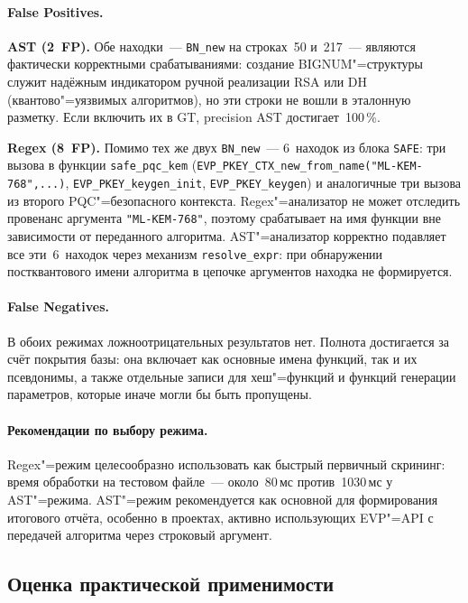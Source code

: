 \paragraph{False Positives.}
\textbf{AST (2~FP).}
Обе находки~--- \texttt{BN\_new} на строках~50 и~217~---
являются фактически корректными срабатываниями: создание
BIGNUM"=структуры служит надёжным индикатором ручной реализации
RSA или DH (квантово"=уязвимых алгоритмов), но эти строки не
вошли в эталонную разметку.
Если включить их в GT, precision AST достигает~100\,\%.

\textbf{Regex (8~FP).}
Помимо тех же двух \texttt{BN\_new}~--- 6~находок из блока
\texttt{SAFE}: три вызова в функции \texttt{safe\_pqc\_kem}
(\texttt{EVP\_PKEY\_CTX\_new\_from\_name("ML-KEM-768",...)},
\texttt{EVP\_PKEY\_keygen\_init}, \texttt{EVP\_PKEY\_keygen})
и аналогичные три вызова из второго PQC"=безопасного контекста.
Regex"=анализатор не может отследить провенанс аргумента
\texttt{"ML-KEM-768"}, поэтому срабатывает на имя функции
вне зависимости от переданного алгоритма.
AST"=анализатор корректно подавляет все эти~6~находок через
механизм \texttt{resolve\_expr}: при обнаружении постквантового
имени алгоритма в цепочке аргументов находка не формируется.

\paragraph{False Negatives.}
В обоих режимах ложноотрицательных результатов нет.
Полнота достигается за счёт покрытия базы: она включает
как основные имена функций, так и их псевдонимы, а также
отдельные записи для хеш"=функций и функций генерации параметров,
которые иначе могли бы быть пропущены.

\paragraph{Рекомендации по выбору режима.}
Regex"=режим целесообразно использовать как быстрый первичный
скрининг: время обработки на тестовом файле~--- около~80\,мс
против~1030\,мс у AST"=режима.
AST"=режим рекомендуется как основной для формирования итогового
отчёта, особенно в проектах, активно использующих EVP"=API
с передачей алгоритма через строковый аргумент.

\subsection{Оценка практической применимости}

